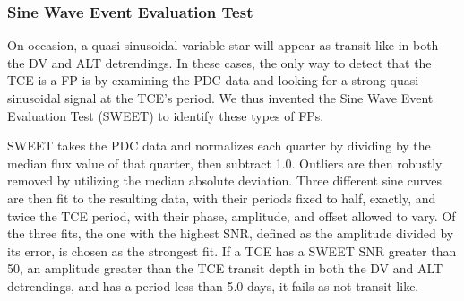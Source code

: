 %





\subsubsection{Sine Wave Event Evaluation Test}
\label{s:sweetntl}

On occasion, a quasi-sinusoidal variable star will appear as transit-like in both the DV and ALT detrendings. In these cases, the only way to detect that the TCE is a FP is by examining the PDC data and looking for a strong quasi-sinusoidal signal at the TCE's period. We thus invented the Sine Wave Event Evaluation Test (SWEET) to identify these types of FPs.

SWEET takes the PDC data and normalizes each quarter by dividing by the median flux value of that quarter, then subtract 1.0. Outliers are then robustly removed by utilizing the median absolute deviation. Three different sine curves are then fit to the resulting data, with their periods fixed to half, exactly, and twice the TCE period, with their phase, amplitude, and offset allowed to vary. Of the three fits, the one with the highest SNR, defined as the amplitude divided by its error, is chosen as the strongest fit. If a TCE has a SWEET SNR greater than 50, an amplitude greater than the TCE transit depth in both the DV and ALT detrendings, and has a period less than 5.0 days, it fails as not transit-like.




